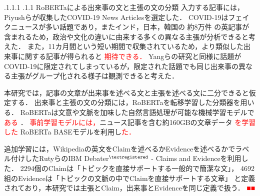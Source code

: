 \documentclass[a4paper, twocolumn, 10pt]{jarticle}
\makeatletter
\def\subsection{%
	\@startsection{subsection}{1}{\z@}%
	{.1\Cvs \@plus.1\Cdp \@minus.1\Cdp}%
	{.1\Cvs \@plus.1\Cdp}%
	{\normalfont\normalsize\bfseries}%
}
\makeatother
\begin{document}
\subsection{RoBERTaによる出来事の文と主張の文の分類}
入力する記事には，Piyushらが収集したCOVID-19 News Articlesを選定した\cite{ghasiya_investigating_2021}．
COVID-19はフェイクニュースが多い話題であり，またインド，日本，韓国の
約8万件
の英記事が含まれるため，政治や文化の違いに由来する多くの異なる主張が分析できると考えた．
また，11カ月間という短い期間で収集されているため，より類似した出来事に関する記事が得られると
\textcolor{red}{期待できる．}
Yangらの研究と同様に話題がCOVID-19に限定されてしまっているが，限定された話題でも同じ出来事の異なる主張がグループ化される様子は観測できると考えた．

本研究では，記事の文章が出来事を述べる文と主張を述べる文に二分できると仮定する．
出来事と主張の文の分類には，RoBERTaを転移学習した分類器を用いる．
RoBERTaは文意や文脈を加味した自然言語処理が可能な機械学習モデルで\textcolor{red}{ある}
\cite{liu_roberta_2019}．
\textcolor{red}{事前学習モデルには，}ニュース記事を含む約160GBの文章データ
\textcolor{red}{を学習した}
RoBERTa BASEモデルを利用し\textcolor{red}{た．}

追加学習には，Wikipediaの英文をClaimを述べるかEvidenceを述べるかでラベル付けしたRutyらのIBM Debater$^{\textregistered}$ - Claims and Evidenceを利用した\cite{rinott_show_2015}．
2294個のClaimは「トピックを直接サポートする一般的で簡潔な文」，
4692組のEvidenceは「トピックの文脈の中でClaimを直接サポートする文章」
と定義されており，本研究では主張とClaim，出来事とEvidenceを同じ定義で扱う．
\textcolor{red}{■■}
\end{document}
